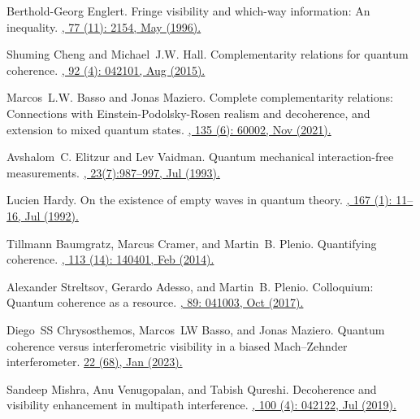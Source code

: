 \documentclass[a4paper,twocolumn,11pt,accepted=2024-01-17]{quantumarticle}
\begin{document}
\begin{thebibliography}{100}
Berthold-Georg Englert.
\newblock Fringe visibility and which-way information: An inequality.
\href{https://doi.org/10.1103/PhysRevLett.77.2154}{, 77 (11): 2154, May (1996).}

Shuming Cheng and Michael~J.W. Hall.
\newblock Complementarity relations for quantum coherence.
\href{https://doi.org/10.1103/PhysRevA.92.042101}{, 92 (4): 042101, Aug (2015).}

Marcos~L.W. Basso and Jonas Maziero.
\newblock Complete complementarity relations: Connections with
  {E}instein-{P}odolsky-{R}osen realism and decoherence, and extension to mixed
  quantum states.
\href{http://dx.doi.org/10.1209/0295-5075/ac1bc8}{, 135 (6): 60002, Nov (2021).}

Avshalom~C. Elitzur and Lev Vaidman.
\newblock Quantum mechanical interaction-free measurements.
\href{https://doi.org/10.1007/BF00736012}{, 23(7):987--997, Jul (1993).}

Lucien Hardy.
\newblock On the existence of empty waves in quantum theory.
\href{https://doi.org/10.1016/0375-9601(92)90618-V}{, 167 (1): 11--16, Jul (1992).}

Tillmann Baumgratz, Marcus Cramer, and Martin~B. Plenio.
\newblock Quantifying coherence.
\href{https://doi.org/10.1103/PhysRevLett.113.140401}{, 113 (14): 140401, Feb (2014).}

Alexander Streltsov, Gerardo Adesso, and Martin~B. Plenio.
\newblock Colloquium: Quantum coherence as a resource.
\href{https://doi.org/10.1103/RevModPhys.89.041003}{, 89: 041003, Oct (2017).}

Diego~SS Chrysosthemos, Marcos~LW Basso, and Jonas Maziero.
\newblock Quantum coherence versus interferometric visibility in a biased Mach–Zehnder interferometer.
\href{https://doi.org/10.1007/s11128-022-03800-6}{ 22 (68), Jan (2023).}

Sandeep Mishra, Anu Venugopalan, and Tabish Qureshi.
\newblock Decoherence and visibility enhancement in multipath interference.
\href{https://doi.org/10.1103/PhysRevA.100.042122}{, 100 (4): 042122, Jul (2019).}


\end{thebibliography}
\end{document}
